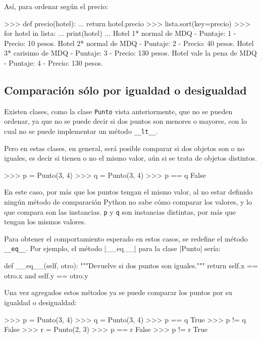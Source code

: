 Así, para ordenar según el precio:

\begin{codigo-python-sn}
>>> def precio(hotel):
...     return hotel.precio
>>> lista.sort(key=precio)
>>> for hotel in lista:
...     print(hotel)
...
Hotel 1* normal de MDQ - Puntaje: 1 - Precio: 10 pesos.
Hotel 2* normal de MDQ - Puntaje: 2 - Precio: 40 pesos.
Hotel 3* carisimo de MDQ - Puntaje: 3 - Precio: 130 pesos.
Hotel vale la pena de MDQ - Puntaje: 4 - Precio: 130 pesos.
\end{codigo-python-sn}

\subsection{Comparación sólo por igualdad o desigualdad}

Existen clases, como la clase \lstinline!Punto! vista anteriormente, que no
se pueden ordenar, ya que no se puede decir si dos puntos son menores o
mayores, con lo cual no se puede implementar un método \lstinline!__lt__!.

Pero en estas clases, en general, será posible comparar si dos objetos son
o no iguales, es decir si tienen o no el mismo valor, aún si se trata de
objetos distintos.

\begin{codigo-python-sn}
>>> p = Punto(3, 4)
>>> q = Punto(3, 4)
>>> p == q
False
\end{codigo-python-sn}

En este caso, por más que los puntos tengan el mismo valor, al no estar
definido ningún método de comparación Python no sabe cómo comparar los
valores, y lo que compara son las instancias.  \lstinline!p! y \lstinline!q!
son instancias distintas, por más que tengan los mismos valores.

Para obtener el comportamiento esperado en estos casos, se redefine el
método \lstinline!__eq__!. Por ejemplo, el método |__eq__| para la clase
|Punto| sería:

\begin{codigo-python-sn}
    def __eq__(self, otro):
        """Devuelve si dos puntos son iguales."""
        return self.x == otro.x and self.y == otro.y
\end{codigo-python-sn}

Una vez agregados estos métodos ya se puede comparar los puntos por su
igualdad o desigualdad:

\begin{codigo-python-sn}
>>> p = Punto(3, 4)
>>> q = Punto(3, 4)
>>> p == q
True
>>> p != q
False
>>> r = Punto(2, 3)
>>> p == r
False
>>> p != r
True
\end{codigo-python-sn}

